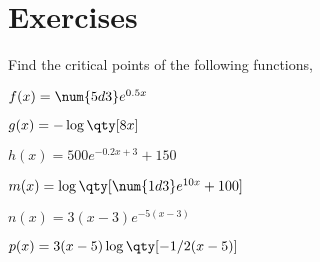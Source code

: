 \documentclass[../main.tex]{subfiles}
\begin{document}
\section{Exercises}

Find the critical points of the following functions,
\begin{enumerate}
    \begin{minipage}[c]{0.45\textwidth}
        \item $f(x)=\num{5d3}e^{0.5 x}$
        \item $g(x)=-\log\qty[8x]$
        \item $h(x)=500e^{-0.2 x + 3}+150$
    \end{minipage}
    \begin{minipage}[c]{0.45\textwidth}
        \item $m(x)=\log\qty[\num{1d3}e^{10 x}+100]$
        \item $n(x)=3(x-3)e^{-5(x-3)}$
        \item $p(x)=3(x-5)\log\qty[-1/2(x-5)]$
    \end{minipage}
\end{enumerate}
\end{document}

